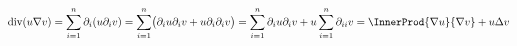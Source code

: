 \documentclass[../full]{subfiles}
\begin{document}

    \begin{equation*}
        \fdiv \paren{u \nabla v}
        = \sum_{i = 1}^n \partial_i \paren{u \partial_i v}
        = \sum_{i = 1}^n
            \paren[\big]{\partial_i u \partial_i v + u \partial_i \partial_i v}
        = \sum_{i = 1}^n \partial_i u \partial_i v
            + u \sum_{i = 1}^n \partial_{ii} v
        = \InnerProd{\nabla u}{\nabla v} + u \Delta v
    \end{equation*}
\end{document}
